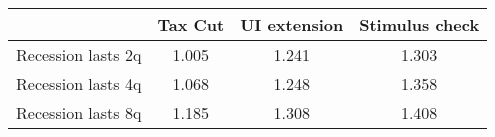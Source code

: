 \begin{tabular}{@{}lccc@{}}
\toprule
& Tax Cut    & UI extension    & Stimulus check    \\  \midrule
Recession lasts 2q &1.005  & 1.241  & 1.303     \\
Recession lasts 4q &1.068  & 1.248  & 1.358     \\
Recession lasts 8q &1.185  & 1.308  & 1.408     \\
\end{tabular}
